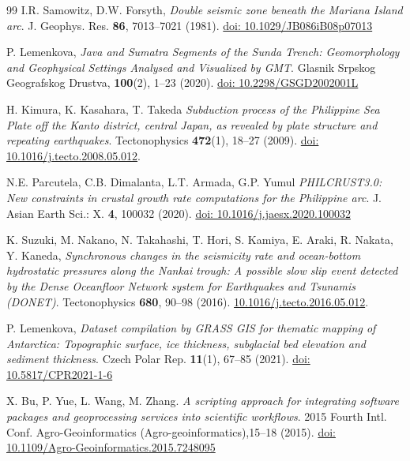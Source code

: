 \documentclass{rrparticle}
\begin{document}
\begin{thebibliography}{99}
 I.R. Samowitz, D.W. Forsyth, \emph{Double seismic zone beneath the Mariana Island arc}. J. Geophys. Res. \textbf{86}, 7013--7021 (1981). \href{https://doi.org/10.1029/JB086iB08p07013}{doi: 10.1029/JB086iB08p07013}

 P. Lemenkova, \emph{Java and Sumatra Segments of the Sunda Trench: Geomorphology and Geophysical Settings Analysed and Visualized by GMT}. Glasnik Srpskog Geografskog Drustva, \textbf{100}(2), 1--23 (2020). \href{https://doi.org/10.2298/GSGD2002001L}{doi: 10.2298/GSGD2002001L}

 H. Kimura, K. Kasahara, T. Takeda \emph{Subduction process of the Philippine Sea Plate off the Kanto district, central Japan, as revealed by plate structure and repeating earthquakes}. Tectonophysics \textbf{472}(1), 18--27 (2009). \href{https://doi.org/10.1016/j.tecto.2008.05.012}{doi: 10.1016/j.tecto.2008.05.012}.

 N.E. Parcutela, C.B. Dimalanta, L.T. Armada, G.P. Yumul \emph{PHILCRUST3.0: New constraints in crustal growth rate computations for the Philippine arc}. J. Asian Earth Sci.: X. \textbf{4}, 100032 (2020). \href{https://doi.org/10.1016/j.jaesx.2020.100032}{doi: 10.1016/j.jaesx.2020.100032}

 K. Suzuki, M. Nakano, N. Takahashi, T. Hori, S. Kamiya, E. Araki, R. Nakata, Y. Kaneda, \emph{Synchronous changes in the seismicity rate and ocean-bottom hydrostatic pressures along the Nankai trough: A possible slow slip event detected by the Dense Oceanfloor Network system for Earthquakes and Tsunamis (DONET)}. Tectonophysics \textbf{680}, 90--98 (2016). \href{https://doi.org/10.1016/j.tecto.2016.05.012}{10.1016/j.tecto.2016.05.012}.

 P. Lemenkova, \emph{Dataset compilation by GRASS GIS for thematic mapping of Antarctica: Topographic surface, ice thickness, subglacial bed elevation and sediment thickness}. Czech Polar Rep. \textbf{11}(1), 67--85 (2021). \href{https://doi.org/10.5817/CPR2021-1-6}{doi: 10.5817/CPR2021-1-6}

 X. Bu, P. Yue, L. Wang, M. Zhang. \emph{A scripting approach for integrating software packages and geoprocessing services into scientific workflows}. 2015 Fourth Intl. Conf. Agro-Geoinformatics (Agro-geoinformatics),15--18 (2015). \href{https://doi.org/10.1109/Agro-Geoinformatics.2015.7248095}{doi: 10.1109/Agro-Geoinformatics.2015.7248095}


\end{thebibliography}
\end{document}
